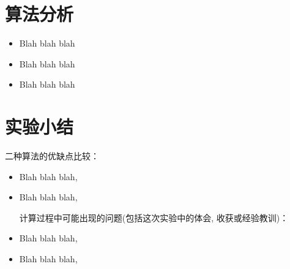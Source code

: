 \documentclass[UTF8]{ctexart}
\begin{document}
\section{算法分析}
\begin{itemize}
    \item Blah blah blah
    \item Blah blah blah
    \item Blah blah blah
\end{itemize}


\section{实验小结}

{二种算法的优缺点比较}：
\begin{itemize}
\item  Blah blah blah,
\item  Blah blah blah,

\hfill %

{计算过程中可能出现的问题(包括这次实验中的体会, 收获或经验教训)}：

\item  Blah blah blah,
\item  Blah blah blah,
\end{itemize}
\end{document}
